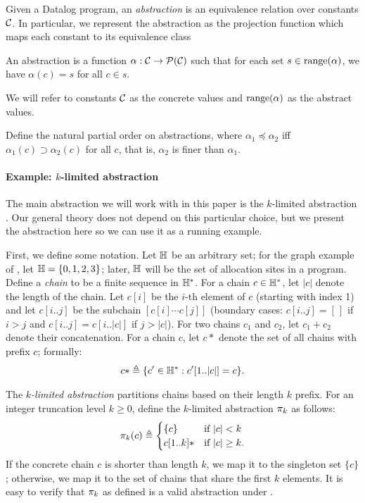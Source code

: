 Given a Datalog program, an {\em abstraction} is an equivalence relation over
constants $\mathcal{C}$.  In particular, we represent the abstraction as the projection
function which maps each constant to its equivalence class
\begin{definition}
\label{def:abstraction}
An abstraction is a function $\alpha : \mathcal{C} \to \mathcal{P}(\mathcal{C})$
such that for each set $s \in \text{\rm range}(\alpha)$,
we have $\alpha(c) = s$ for all $c \in s$.
\end{definition}
We will refer to constants $\mathcal{C}$ as the concrete values and $\text{\rm range}(\alpha)$ as
the abstract values.

Define the natural partial order on abstractions,
where $\alpha_1 \preceq \alpha_2$ iff $\alpha_1(c) \supset \alpha_2(c)$ for all $c$,
that is, $\alpha_2$ is finer than $\alpha_1$.

\paragraph{Example: $k$-limited abstraction}

The main abstraction we will work with in this paper is the $k$-limited abstraction \cite{kcfa,kobj}.
Our general theory does not depend on this particular choice, but we present
the abstraction here so we can use it as a running example.

First, we define some notation.
Let ${\mathbb H}$ be an arbitrary set;
for the graph example of , let ${\mathbb H} = \{ 0, 1, 2, 3 \}$;
later, ${\mathbb H}$ will be the set of allocation sites in a program.
Define a {\em chain} to be a finite sequence in ${\mathbb H}^*$.
For a chain $c \in {\mathbb H}^*$, let $|c|$ denote the length of the chain.
Let $c[i]$ be the $i$-th element of $c$ (starting with index 1) and
let $c[i..j]$ be the subchain $[c[i] \cdots c[j]]$
(boundary cases: $c[i..j] = [\,]$ if $i > j$ and $c[i..j] = c[i..|c|]$ if $j > |c|$).
For two chains $c_1$ and $c_2$, let $c_1+c_2$ denote their concatenation.
For a chain $c$, let $c*$ denote the set of all chains
with prefix $c$; formally:
\begin{align}
c* \triangleq \{ c' \in {\mathbb H}^* : c'[1..|c|] = c \}.
\end{align}

The {\em $k$-limited abstraction}
partitions chains based on their length $k$ prefix.
For an integer truncation level $k \ge 0$, define the $k$-limited abstraction $\pi_k$ as follows:
\begin{align}
\label{eqn:klimitedAbstraction}
\pi_k(c) \triangleq
\begin{cases}
\{c\}     & \text{if $|c| < k$} \\
c[1..k]*  & \text{if $|c| \ge k$}. \\
\end{cases}
\end{align}
If the concrete chain $c$ is shorter than length $k$,
we map it to the singleton set $\{ c \}$;
otherwise, we map it to the set of chains that share the first $k$ elements.
It is easy to verify that $\pi_k$ as defined is a valid abstraction under .

